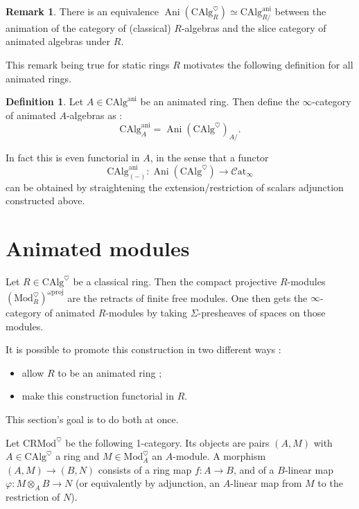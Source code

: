 \documentclass[11pt]{article}
\theoremstyle{definition}
\newtheorem{definition}[theorem]{Definition}
\newtheorem{remark}[theorem]{Remark}
\newcommand{\Ani}{\operatorname{Ani}}
\newcommand{\ani}{\mathrm{ani}}
\newcommand{\CAlg}{\mathrm{CAlg}}
\newcommand{\Catinf}{\mathcal{C}\mathrm{at}_{\infty}}
\newcommand{\CRMod}{\mathrm{CRMod}}
\newcommand{\heart}{\heartsuit}
\newcommand{\Mod}{\mathrm{Mod}}
\newcommand{\proj}{\mathrm{proj}}
\begin{document}
\begin{remark}
    There is an equivalence $\Ani(\CAlg_R^{\heart}) \simeq \CAlg^{\ani}_{R/}$ between the animation of the category of (classical) $R$-algebras and the slice category of animated algebras under $R$.
\end{remark}

This remark being true for static rings $R$ motivates the following definition for all animated rings.

\begin{definition}
    Let $A \in \CAlg^{\ani}$ be an animated ring.
    Then define the $\infty$-category of animated $A$-algebras as :
    \[
        \CAlg_A^{\ani} = \Ani(\CAlg^{\heart})_{A/}.
    \]
\end{definition}
In fact this is even functorial in $A$, in the sense that a functor
\[
    \CAlg_{(-)}^{\ani} : \Ani(\CAlg^{\heart}) \to \Catinf
\]
can be obtained by straightening the extension/restriction of scalars adjunction constructed above.

\section{Animated modules}

Let $R \in \CAlg^{\heart}$ be a classical ring.
Then the compact projective $R$-modules $(\Mod_R^{\heart})^{\omega\proj}$ are the retracts of finite free modules.
One then gets the $\infty$-category of animated $R$-modules by taking $\Sigma$-presheaves of spaces on those modules.

It is possible to promote this construction in two different ways :
\begin{itemize}
    \item allow $R$ to be an animated ring ;
    \item make this construction functorial in $R$.
\end{itemize}
This section's goal is to do both at once.

Let $\CRMod^{\heart}$ be the following 1-category.
Its objects are pairs $(A, M)$ with $A \in \CAlg^{\heart}$ a ring and $M \in \Mod_A^{\heart}$ an $A$-module.
A morphism $(A, M) \to (B, N)$ consists of a ring map $f : A \to B$, and of a $B$-linear map $\varphi : M \otimes_A B \to N$ (or equivalently by adjunction, an $A$-linear map from $M$ to the restriction of $N$).
\end{document}
